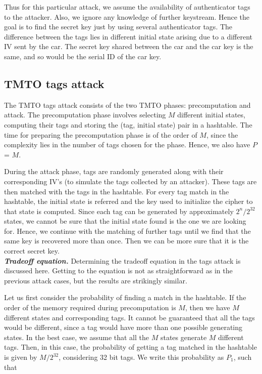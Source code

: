 Thus for this particular attack, we assume the availability of authenticator tags to the attacker. Also, we ignore any knowledge of further keystream. Hence the goal is to find the secret key just by using several authenticator tags. The difference between the tags lies in different initial state arising due to a different IV sent by the car. The secret key shared between the car and the car key is the same, and so would be the serial ID of the car key.

\subsection{TMTO tags attack}

The TMTO tags attack consists of the two TMTO phases: precomputation and attack. The precomputation phase involves selecting $M$ different initial states, computing their tags and storing the (tag, initial state) pair in a hashtable. The time for preparing the precomputation phase is of the order of $M$, since the complexity lies in the number of tags chosen for the phase. Hence, we also have $P$ = $M$.

During the attack phase, tags are randomly generated along with their corresponding IV's (to simulate the tags collected by an attacker). These tags are then matched with the tags in the hashtable. For every tag match in the hashtable, the initial state is referred and the key used to initialize the cipher to that state is computed. Since each tag can be generated by approximately $2^n/2^{32}$ states, we cannot be sure that the initial state found is the one we are looking for. Hence, we continue with the matching of further tags until we find that the same key is recovered more than once. Then we can be more sure that it is the correct secret key.\\

\noindent \textit{\textbf{Tradeoff equation.}} Determining the tradeoff equation in the tags attack is discussed here. Getting to the equation is not as straightforward as in the previous attack cases, but the results are strikingly similar.

Let us first consider the probability of finding a match in the hashtable. If the order of the memory required during precomputation is $M$, then we have $M$ different states and corresponding tags. It cannot be guaranteed that all the tags would be different, since a tag would have more than one possible generating states. In the best case, we assume that all the $M$ states generate $M$ different tags. Then, in this case, the probability of getting a tag matched in the hashtable is given by $M/2^{32}$, considering 32 bit tags. We write this probability as $P_1$, such that

